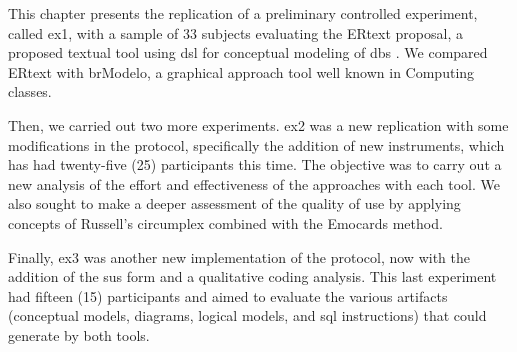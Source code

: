 This chapter presents the replication of a preliminary controlled experiment, called \ac{ex1}, with a sample of 33 subjects evaluating the ERtext proposal, a proposed textual tool using \ac{dsl} for conceptual modeling of \acp{db} .
We compared ERtext with brModelo, a graphical approach tool well known in Computing classes.

Then, we carried out two more experiments.
\ac{ex2} was a new replication with some modifications in the protocol, specifically the addition of new instruments, which has had twenty-five (25) participants this time.
The objective was to carry out a new analysis of the effort and effectiveness of the approaches with each tool.
We also sought to make a deeper assessment of the quality of use by applying concepts of Russell's circumplex combined with the Emocards method.

Finally, \ac{ex3} was another new implementation of the protocol, now with the addition of the \ac{sus} form and a qualitative coding analysis.
This last experiment had fifteen (15) participants and aimed to evaluate the various artifacts (conceptual models, diagrams, logical models, and \ac{sql} instructions) that could generate by both tools.

